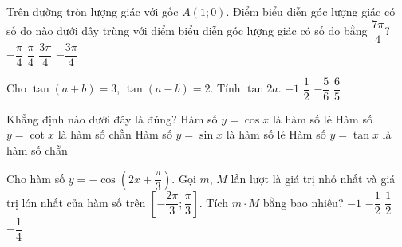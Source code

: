 ﻿\begin{name}
	{\tenchude}
	{\tendethi}
	{\tentruong}
	{\thoigian}
\end{name}
\setcounter{ex}{0}\setcounter{bt}{0}
\TN
\begin{ex}%
Trên đường tròn lượng giác với gốc $A(1;0)$. Điểm biểu diễn góc lượng giác có số đo nào dưới đây trùng với điểm biểu diễn góc lượng giác có số đo bằng $\dfrac{7\pi }{4}$?
\choice
{\True $-\dfrac{\pi }{4}$}
{$\dfrac{\pi }{4}$}
{$\dfrac{3\pi }{4}$}
{$-\dfrac{3\pi }{4}$}
\end{ex}

\begin{ex}%
Cho $\tan (a+b)=3$, $\tan (a-b)=2$. Tính $\tan 2a$.
\choice
{\True $-1$}
{$\dfrac{1}{2}$}
{$-\dfrac{5}{6}$}
{$\dfrac{6}{5}$}
\end{ex}

\begin{ex}%
Khẳng định nào dưới đây là đúng?
\choice
{Hàm số $y=\cos x$ là hàm số lẻ}
{Hàm số $y=\cot x$ là hàm số chẵn}
{\True Hàm số $y=\sin x$ là hàm số lẻ}
{Hàm số $y=\tan x$ là hàm số chẵn}
\end{ex}

\begin{ex}%
Cho hàm số $y=-\cos\left(2x+\dfrac{\pi}{3}\right)$. Gọi $m$, $M$ lần lượt là giá trị nhỏ nhất và giá trị lớn nhất của hàm số trên $\left[-\dfrac{2\pi}{3}; \dfrac{\pi}{3}\right]$. Tích $m\cdot M$ bằng bao nhiêu?
\choice
{\True $-1$}
{$-\dfrac{1}{2}$}
{$\dfrac{1}{2}$}
{$-\dfrac{1}{4}$}
\end{ex}

